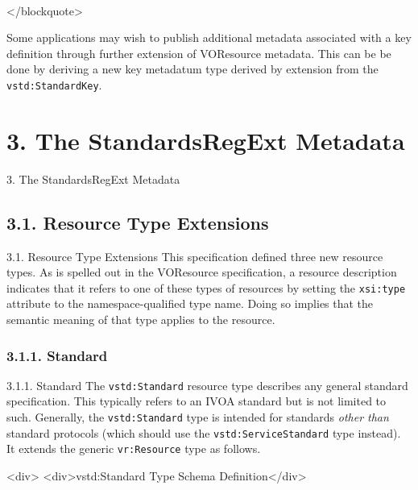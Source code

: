 \documentclass[11pt,a4paper]{ivoa}
\begin{document}
{{\begin{table}
\begin{tabular}[FIXTHIS]
\begin{description}
\end{description}

\\

\end{tabular}
\end{table}
</blockquote>

Some applications may wish to publish additional metadata associated
with a key definition through further extension of VOResource
metadata.  This can be be done by deriving a new key metadatum type
derived by extension from the \texttt{vstd:StandardKey}.  



\section{3. The StandardsRegExt Metadata}

\label{}

3. The StandardsRegExt Metadata
\subsection{3.1. Resource Type Extensions}

\label{}

3.1. Resource Type Extensions
This specification defined three new resource types.  As is spelled
out in the VOResource specification, a resource description indicates
that it refers to one of these types of resources by setting the
\texttt{xsi:type} attribute to the namespace-qualified type name.
Doing so implies that the semantic meaning of that type applies to the
resource.  



\subsubsection{3.1.1. Standard}

\label{}

3.1.1. Standard
The \texttt{vstd:Standard} resource type describes any general
standard specification.  This typically refers to an IVOA standard but
is not limited to such.  Generally, the \texttt{vstd:Standard}
type is intended for standards \emph{other than} standard
protocols (which should use the \texttt{vstd:ServiceStandard} type
instead).  It extends the generic \texttt{vr:Resource} type as
follows.  



<div>
<div>vstd:Standard Type Schema Definition</div>

}}
\end{document}
